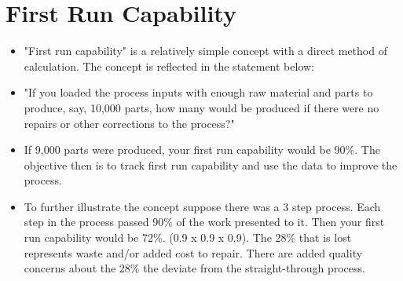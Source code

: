 \section{First Run Capability}
\begin{itemize}
\item "First run capability" is a relatively simple concept with a direct method of calculation. The concept is reflected in the statement below:

\item "If you loaded the process inputs with enough raw material and parts to produce, say, 10,000 parts, how many would be produced if there were no repairs or other corrections to the process?"

\item If 9,000 parts were produced, your first run capability would be 90\%. The objective then is to track first run capability and use the data to improve the process.

\item To further illustrate the concept suppose there was a 3 step process. Each step in the process passed 90\% of the work presented to it. Then your first run capability would be 72\%. (0.9 x 0.9 x 0.9). The 28\% that is lost represents waste and/or added cost to repair. There are added quality concerns about the 28\% the deviate from the straight-through process.
\end{itemize}
